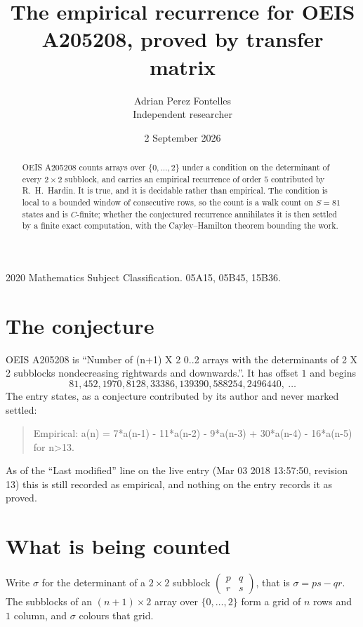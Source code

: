 \documentclass[11pt,a4paper]{article}
\title{The empirical recurrence for OEIS A205208, proved by transfer matrix}
\author{Adrian Perez Fontelles\\ \small Independent researcher}
\date{2 September 2026}
\theoremstyle{plain}
\theoremstyle{definition}
\begin{document}
\maketitle

\begin{abstract}
OEIS A205208 counts arrays over $\{0,\dots,2\}$ under a condition on the determinant of every
$2\times2$ subblock, and carries an empirical recurrence of order $5$ contributed by
R.~H.~Hardin. It is true, and it is decidable rather than empirical. The condition is local to
a bounded window of consecutive rows, so the count is a walk count on $S=81$ states and is
$C$-finite; whether the conjectured recurrence annihilates it is then settled by a finite exact
computation, with the Cayley--Hamilton theorem bounding the work.
\end{abstract}

\noindent\small 2020 Mathematics Subject Classification. 05A15, 05B45, 15B36.\normalsize

\section{The conjecture}

OEIS A205208 is ``Number of (n+1) X 2 0..2 arrays with the determinants of 2 X 2 subblocks nondecreasing rightwards and downwards.''. It has offset $1$ and begins
\[
81, 452, 1970, 8128, 33386, 139390, 588254, 2496440,\ \dots
\]
The entry states, as a conjecture contributed by its author and never marked settled:
\begin{quote}
Empirical: a(n) = 7*a(n-1) - 11*a(n-2) - 9*a(n-3) + 30*a(n-4) - 16*a(n-5) for n>13.
\end{quote}
As of the ``Last modified'' line on the live entry (Mar 03 2018 13:57:50, revision 13) this is still
recorded as empirical, and nothing on the entry records it as proved.

\section{What is being counted}

Write $\sigma$ for the determinant of a $2\times2$ subblock
$\begin{pmatrix}p&q\\r&s\end{pmatrix}$, that is $\sigma=ps-qr$. The subblocks of an
$(n+1)\times2$ array over $\{0,\dots,2\}$ form a grid of $n$ rows and $1$
column, and $\sigma$ colours that grid.
\end{document}
